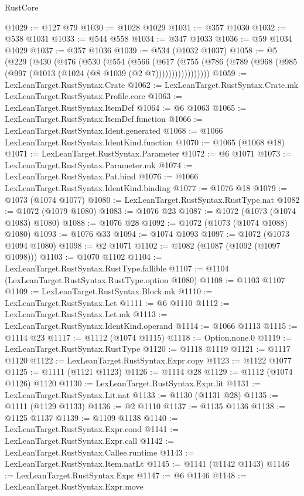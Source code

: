 \begin{lexlean}{RustCore}
\begin{coremodule}
@1029 := @127 @79
@1030 := @1028 @1029
@1031 := @357 @1030
@1032 := @538 @1031
@1033 := @544 @558
@1034 := @347 @1033
@1036 := @59 @1034 @1029
@1037 := @357 @1036
@1039 := @534 (@1032 @1037)
@1058 := @5
    (@229
      (@430
        (@476
          (@530
            (@554
              (@566
                (@617
                  (@755
                    (@786 (@789 (@968 (@985 (@997 (@1013 (@1024 (@8 @1039 (@2 @7)))))))))))))))))
@1059 := LexLeanTarget.RustSyntax.Crate
@1062 := LexLeanTarget.RustSyntax.Crate.mk LexLeanTarget.RustSyntax.Profile.core
@1063 := LexLeanTarget.RustSyntax.ItemDef
@1064 := @6 @1063
@1065 := LexLeanTarget.RustSyntax.ItemDef.function
@1066 := LexLeanTarget.RustSyntax.Ident.generated
@1068 := @1066 LexLeanTarget.RustSyntax.IdentKind.function
@1070 := @1065 (@1068 @18)
@1071 := LexLeanTarget.RustSyntax.Parameter
@1072 := @6 @1071
@1073 := LexLeanTarget.RustSyntax.Parameter.mk
@1074 := LexLeanTarget.RustSyntax.Pat.bind
@1076 := @1066 LexLeanTarget.RustSyntax.IdentKind.binding
@1077 := @1076 @18
@1079 := @1073 (@1074 @1077)
@1080 := LexLeanTarget.RustSyntax.RustType.nat
@1082 := @1072 (@1079 @1080)
@1083 := @1076 @23
@1087 := @1072 (@1073 (@1074 @1083) @1080)
@1088 := @1076 @28
@1092 := @1072 (@1073 (@1074 @1088) @1080)
@1093 := @1076 @33
@1094 := @1074 @1093
@1097 := @1072 (@1073 @1094 @1080)
@1098 := @2 @1071
@1102 := @1082 (@1087 (@1092 (@1097 @1098)))
@1103 := @1070 @1102
@1104 := LexLeanTarget.RustSyntax.RustType.fallible
@1107 := @1104 (LexLeanTarget.RustSyntax.RustType.option @1080)
@1108 := @1103 @1107
@1109 := LexLeanTarget.RustSyntax.Block.mk
@1110 := LexLeanTarget.RustSyntax.Let
@1111 := @6 @1110
@1112 := LexLeanTarget.RustSyntax.Let.mk
@1113 := LexLeanTarget.RustSyntax.IdentKind.operand
@1114 := @1066 @1113
@1115 := @1114 @23
@1117 := @1112 (@1074 @1115)
@1118 := Option.none.{0}
@1119 := LexLeanTarget.RustSyntax.RustType
@1120 := @1118 @1119
@1121 := @1117 @1120
@1122 := LexLeanTarget.RustSyntax.Expr.copy
@1123 := @1122 @1077
@1125 := @1111 (@1121 @1123)
@1126 := @1114 @28
@1129 := @1112 (@1074 @1126) @1120
@1130 := LexLeanTarget.RustSyntax.Expr.lit
@1131 := LexLeanTarget.RustSyntax.Lit.nat
@1133 := @1130 (@1131 @28)
@1135 := @1111 (@1129 @1133)
@1136 := @2 @1110
@1137 := @1135 @1136
@1138 := @1125 @1137
@1139 := @1109 @1138
@1140 := LexLeanTarget.RustSyntax.Expr.cond
@1141 := LexLeanTarget.RustSyntax.Expr.call
@1142 := LexLeanTarget.RustSyntax.Callee.runtime
@1143 := LexLeanTarget.RustSyntax.Item.natLt
@1145 := @1141 (@1142 @1143)
@1146 := LexLeanTarget.RustSyntax.Expr
@1147 := @6 @1146
@1148 := LexLeanTarget.RustSyntax.Expr.move

\end{coremodule}
\end{lexlean}
